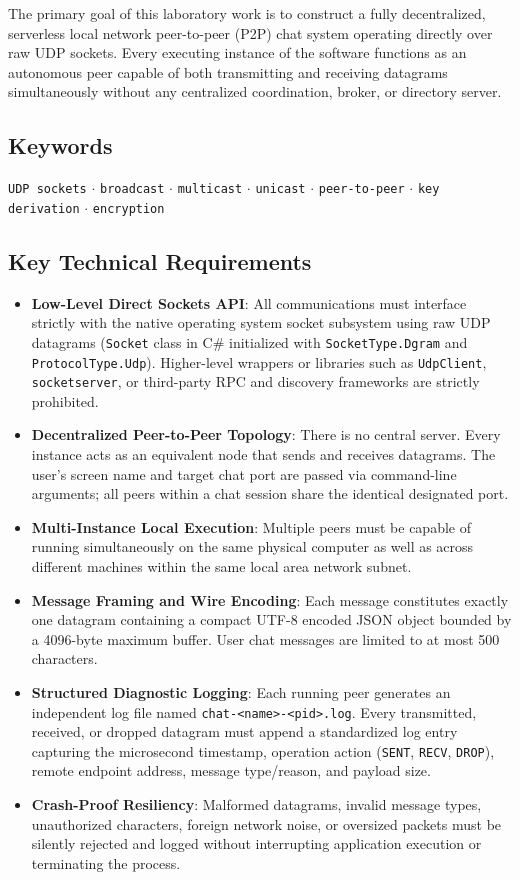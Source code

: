 \documentclass[11pt,a4paper]{article}
\begin{document}
The primary goal of this laboratory work is to construct a fully decentralized, serverless local network peer-to-peer (P2P) chat system operating directly over raw UDP sockets. Every executing instance of the software functions as an autonomous peer capable of both transmitting and receiving datagrams simultaneously without any centralized coordination, broker, or directory server.

\subsection{Keywords}
\texttt{UDP sockets} $\cdot$ \texttt{broadcast} $\cdot$ \texttt{multicast} $\cdot$ \texttt{unicast} $\cdot$ \texttt{peer-to-peer} $\cdot$ \texttt{key derivation} $\cdot$ \texttt{encryption}

\subsection{Key Technical Requirements}
\begin{itemize}[noitemsep]
    \item \textbf{Low-Level Direct Sockets API}: All communications must interface strictly with the native operating system socket subsystem using raw UDP datagrams (\texttt{Socket} class in C\# initialized with \texttt{SocketType.Dgram} and \texttt{ProtocolType.Udp}). Higher-level wrappers or libraries such as \texttt{UdpClient}, \texttt{socketserver}, or third-party RPC and discovery frameworks are strictly prohibited.
    \item \textbf{Decentralized Peer-to-Peer Topology}: There is no central server. Every instance acts as an equivalent node that sends and receives datagrams. The user's screen name and target chat port are passed via command-line arguments; all peers within a chat session share the identical designated port.
    \item \textbf{Multi-Instance Local Execution}: Multiple peers must be capable of running simultaneously on the same physical computer as well as across different machines within the same local area network subnet.
    \item \textbf{Message Framing and Wire Encoding}: Each message constitutes exactly one datagram containing a compact UTF-8 encoded JSON object bounded by a 4096-byte maximum buffer. User chat messages are limited to at most 500 characters.
    \item \textbf{Structured Diagnostic Logging}: Each running peer generates an independent log file named \texttt{chat-<name>-<pid>.log}. Every transmitted, received, or dropped datagram must append a standardized log entry capturing the microsecond timestamp, operation action (\texttt{SENT}, \texttt{RECV}, \texttt{DROP}), remote endpoint address, message type/reason, and payload size.
    \item \textbf{Crash-Proof Resiliency}: Malformed datagrams, invalid message types, unauthorized characters, foreign network noise, or oversized packets must be silently rejected and logged without interrupting application execution or terminating the process.
\end{itemize}
\end{document}
